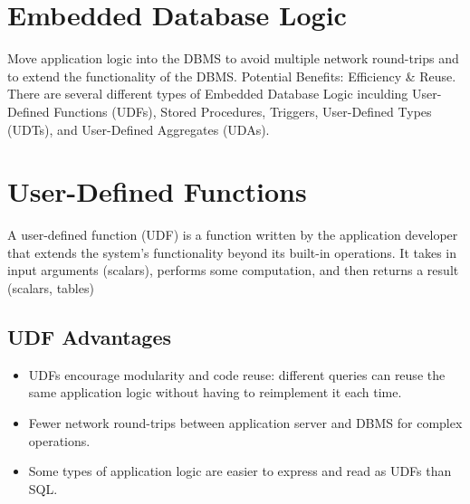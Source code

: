 \documentclass[11pt]{article}
\begin{document}
\maketitle
\thispagestyle{plain}

\section{Embedded Database Logic}
Move application logic into the DBMS to avoid multiple network round-trips and to extend the functionality of the DBMS. Potential Benefits: Efficiency \& Reuse.
There are several different types of Embedded Database Logic inculding User-Defined Functions (UDFs), Stored Procedures, Triggers, User-Defined Types (UDTs), and User-Defined Aggregates (UDAs).

\section{User-Defined Functions}
A user-defined function (UDF) is a function written by the application developer that extends the system's functionality beyond its built-in operations. It takes in input arguments (scalars), performs some computation, and then returns a result (scalars, tables)

\subsection*{UDF Advantages}
\begin{itemize}
	\item UDFs encourage modularity and code reuse: different queries can reuse the same application logic without having to reimplement it each time.
	
	\item Fewer network round-trips between application server and DBMS for complex operations.
	
	\item Some types of application logic are easier to express and read as UDFs than SQL.
\end{itemize}
\end{document}
